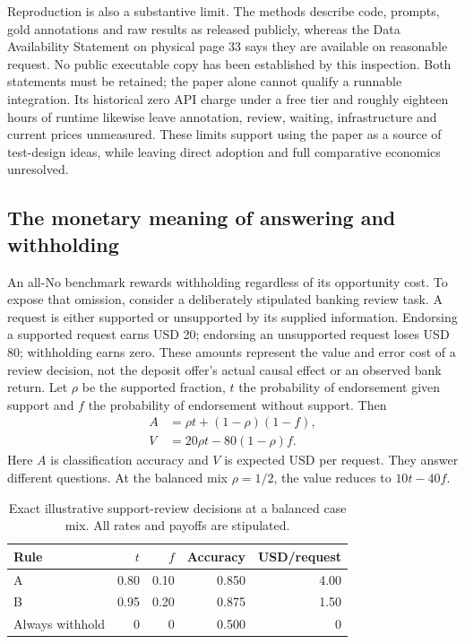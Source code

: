 Reproduction is also a substantive limit. The methods describe code, prompts,
gold annotations and raw results as released publicly, whereas the Data
Availability Statement on physical page 33 says they are available on
reasonable request. No public executable copy has been established by this
inspection. Both statements must be retained; the paper alone cannot qualify
a runnable integration. Its historical zero API charge under a free tier and
roughly eighteen hours of runtime likewise leave annotation, review, waiting,
infrastructure and current prices unmeasured. These limits support using the
paper as a source of test-design ideas, while leaving direct adoption and full
comparative economics unresolved.~\citep{exec17_benchmark_cherif}

\subsection{The monetary meaning of answering and withholding}

An all-No benchmark rewards withholding regardless of its opportunity cost.
To expose that omission, consider a deliberately stipulated banking review
task. A request is either supported or unsupported by its supplied information.
Endorsing a supported request earns USD 20; endorsing an unsupported request
loses USD 80; withholding earns zero. These amounts represent the value and
error cost of a review decision, not the deposit offer's actual causal effect
or an observed bank return. Let $\rho$ be the supported fraction, $t$ the
probability of endorsement given support and $f$ the probability of endorsement
without support. Then
\begin{align}
 A&=\rho t+(1-\rho)(1-f),
       \label{exec17:benchmark-accuracy}\\
 V&=20\rho t-80(1-\rho)f.
       \label{exec17:benchmark-value}
\end{align}
Here $A$ is classification accuracy and $V$ is expected USD per request.
They answer different questions. At the balanced mix $\rho=1/2$, the value
reduces to $10t-40f$.
\citep{exec17_benchmark_exact}

\begin{table}[htbp]
\centering
\caption{Exact illustrative support-review decisions at a balanced case mix.
All rates and payoffs are stipulated.}
\label{exec17:benchmark-bank-table}
\begin{tabular}{lrrrr}
\toprule
Rule & $t$ & $f$ & Accuracy & USD/request\\
\midrule
A & 0.80 & 0.10 & 0.850 & 4.00\\
B & 0.95 & 0.20 & 0.875 & 1.50\\
Always withhold & 0 & 0 & 0.500 & 0\\
\bottomrule
\end{tabular}
\end{table}

